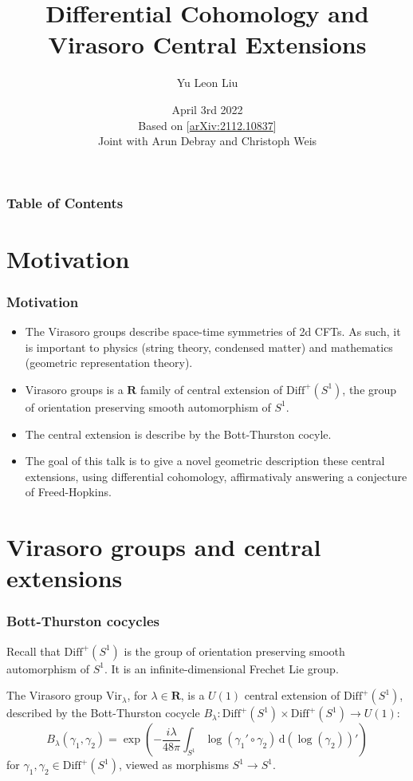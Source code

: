 \documentclass{beamer}
\title{Differential Cohomology and Virasoro Central Extensions}
\author[Yu Leon Liu ]{Yu Leon Liu} %
\institute[Rouen University]{\textbf {Rouen University}}\institute{Harvard University}
\date[April 2rd 2022] {April 3rd 2022 \\ \vspace{5mm} Based on [\href{https://arxiv.org/abs/2112.10837}{arXiv:2112.10837}] \\ Joint with Arun Debray and Christoph Weis}
\newcommand{\mb}{\mathbf}
\newcommand{\Diff}{\mathrm{Diff}^+(S^1)}
\renewcommand{\d}{\mathrm d}
\newcommand{\ud}{\,\d}
\newcommand{\Vir}{\mathrm{Vir}}
\begin{document}
\frame{\titlepage}

\begin{frame}
    \frametitle{Table of Contents}
    \tableofcontents
    \end{frame}


\section{Motivation}
\begin{frame}
\frametitle{Motivation}
\begin{itemize}
    \item <1 -> The \alert{Virasoro groups} describe space-time symmetries 
    of 2d CFTs. As such, it is important to physics (string theory, condensed matter) and 
    mathematics (geometric representation theory).
    \item <2 -> \alert{Virasoro groups} is a $\mb{R}$ family of central extension of $\Diff$, the group of 
    orientation preserving smooth automorphism of $S^1$. 
    \item <3 -> The central extension is describe by the 
    \alert{Bott-Thurston cocyle}. 
    \item <4 -> The goal of this talk is to give a novel geometric description 
    these central extensions, using differential cohomology, affirmativaly answering a conjecture of Freed-Hopkins.
\end{itemize}

\end{frame}

\section{Virasoro groups and central extensions}

\begin{frame}
    \frametitle{Bott-Thurston cocycles}

Recall that $\Diff$ is the group of orientation preserving smooth automorphism of $S^1$. 
It is an infinite-dimensional Frechet Lie group. \pause
    \begin{definition}
The Virasoro group $\Vir_\lambda$, for $\lambda \in \mb{R}$, is a $U(1)$ central extension of $\Diff$, described by the \alert{Bott-Thurston cocycle}
$B_\lambda: \Diff \times \Diff \to U(1)$: \pause
\begin{equation}
    B_\lambda(\gamma_1, \gamma_2) = \exp\left(-\frac{i\lambda}{48\pi}\int_{S^1} \log(\gamma_1'
        \circ\gamma_2) \ud(\log(\gamma_2))'\right)
\end{equation}
for $\gamma_1, \gamma_2 \in \Diff$, viewed as morphisms $S^1 \to S^1$.
\end{definition}
\end{frame}
\end{document}
